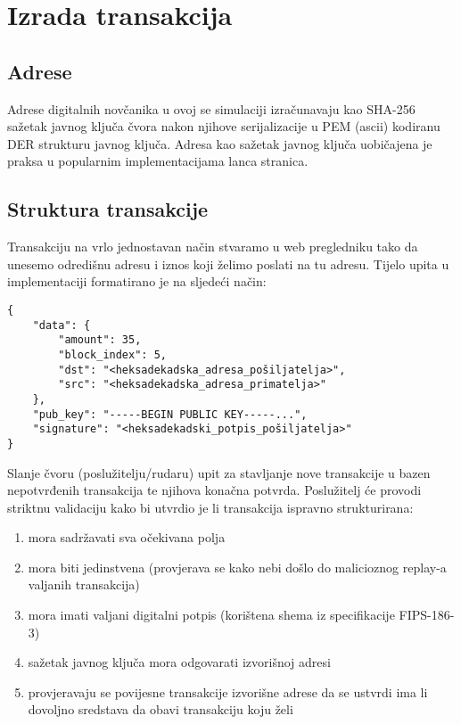 \documentclass[utf8, zavrsni]{fer}
\begin{document}
\section{Izrada transakcija}

\subsection{Adrese}
Adrese digitalnih novčanika u ovoj se simulaciji izračunavaju kao SHA-256 sažetak javnog ključa čvora nakon njihove serijalizacije u PEM (ascii) kodiranu DER strukturu javnog ključa. Adresa kao sažetak javnog ključa uobičajena je praksa u popularnim implementacijama lanca stranica.

\subsection{Struktura transakcije}
Transakciju na vrlo jednostavan način stvaramo u web pregledniku tako da unesemo odredišnu adresu i iznos koji želimo poslati na tu adresu. Tijelo upita u implementaciji formatirano je na sljedeći način:
\begin{verbatim}
{
	"data": {
		"amount": 35,
		"block_index": 5,
		"dst": "<heksadekadska_adresa_pošiljatelja>",
		"src": "<heksadekadska_adresa_primatelja>"
	},
	"pub_key": "-----BEGIN PUBLIC KEY-----...",
	"signature": "<heksadekadski_potpis_pošiljatelja>"
}
\end{verbatim}

Slanje čvoru (poslužitelju/rudaru) upit za stavljanje nove transakcije u bazen nepotvrđenih transakcija te njihova konačna potvrda. Poslužitelj će provodi striktnu validaciju kako bi utvrdio je li transakcija ispravno strukturirana:

\begin{enumerate}
	\item mora sadržavati sva očekivana polja
	\item mora biti jedinstvena (provjerava se kako nebi došlo do malicioznog replay-a valjanih transakcija)
	\item mora imati valjani digitalni potpis (korištena shema iz specifikacije FIPS-186-3)
	\item sažetak javnog ključa mora odgovarati izvorišnoj adresi
	\item provjeravaju se povijesne transakcije izvorišne adrese da se ustvrdi ima li dovoljno sredstava da obavi transakciju koju želi
\end{enumerate}
\end{document}

